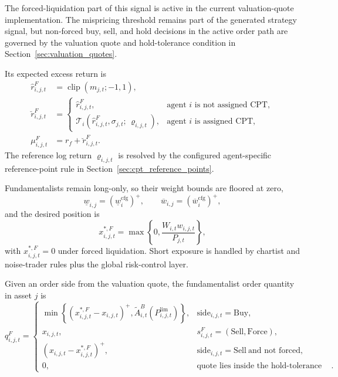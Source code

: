 \documentclass[12pt, a4paper]{article}
\DeclareMathOperator{\clip}{clip}
\newcommand{\pospart}[1]{\left(#1\right)^{+}}
\begin{document}
    The forced-liquidation part of this signal is active in the current
    valuation-quote implementation. The mispricing threshold remains part of the
    generated strategy signal, but non-forced buy, sell, and hold decisions in the
    active order path are governed by the valuation quote and hold-tolerance
    condition in Section~\ref{sec:valuation_quotes}.

    Its expected excess return is
    \begin{align*}
        \hat r_{i,j,t}^{F}&=\clip(m_{j,t};-1,1),\\
        \breve r_{i,j,t}^{F}&=
        \begin{cases}
            \hat r_{i,j,t}^{F}, & \text{agent } i \text{ is not assigned CPT},\\
            \mathcal{T}_i\!\left(\hat r_{i,j,t}^{F},\sigma_{j,t};\,\varrho_{i,j,t}\right), & \text{agent } i \text{ is assigned CPT},
        \end{cases}
        \\
        \mu_{i,j,t}^{F}&=r_f+\breve r_{i,j,t}^{F}.
    \end{align*}
    The reference log return \(\varrho_{i,j,t}\) is resolved by the configured
    agent-specific reference-point rule in Section~\ref{sec:cpt_reference_points}.

    Fundamentalists remain long-only, so their weight bounds are floored at zero,
    \[
        \underline w_{i,j}=\pospart{\underline w_i^{\text{cfg}}},
        \qquad
        \overline w_{i,j}=\pospart{\overline w_i^{\text{cfg}}},
    \]
    and the desired position is
    \[
        x_{i,j,t}^{\ast,F}=\max\left\{0,\frac{W_{i,t}w_{i,j,t}}{P_{j,t}}\right\},
    \]
    with \(x_{i,j,t}^{\ast,F}=0\) under forced liquidation. Short exposure is
    handled by chartist and noise-trader rules plus the global risk-control layer.

    Given an order side from the valuation quote, the fundamentalist order quantity
    in asset \(j\) is
    \[
        q_{i,j,t}^{F}=
        \begin{cases}
            \min\left\{\pospart{x_{i,j,t}^{\ast,F}-x_{i,j,t}},\tilde A_{i,t}^{B}(P_{i,j,t}^{\text{lim}})\right\},
            & \mathrm{side}_{i,j,t}=\mathrm{Buy},\\[1.2ex]
            x_{i,j,t},
            & s_{i,j,t}^{F}=(\mathrm{Sell},\mathrm{Force}),\\[1.2ex]
            \pospart{x_{i,j,t}-x_{i,j,t}^{\ast,F}},
            & \mathrm{side}_{i,j,t}=\mathrm{Sell}\ \text{and not forced},\\[1.2ex]
            0,
            & \text{quote lies inside the hold-tolerance band}.
        \end{cases}
    \]
\end{document}
